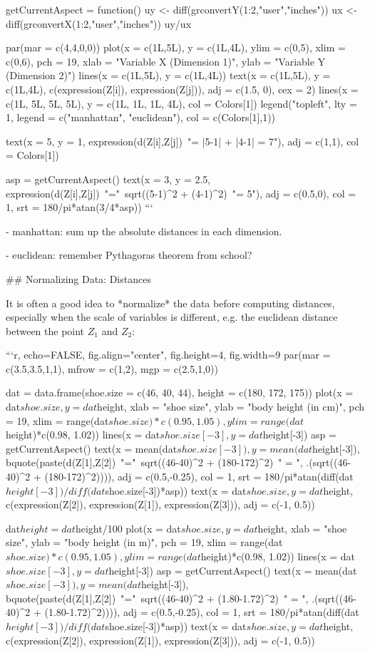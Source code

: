 getCurrentAspect = function() {
   uy <- diff(grconvertY(1:2,"user","inches"))
   ux <- diff(grconvertX(1:2,"user","inches"))
   uy/ux
}

par(mar = c(4,4,0,0))
plot(x = c(1L,5L), y = c(1L,4L), ylim = c(0,5), xlim = c(0,6), pch = 19,
  xlab = "Variable X (Dimension 1)", ylab = "Variable Y (Dimension 2)")
lines(x = c(1L,5L), y = c(1L,4L))
text(x = c(1L,5L), y = c(1L,4L), c(expression(Z[i]), expression(Z[j])), adj = c(1.5, 0), cex = 2)
lines(x = c(1L, 5L, 5L, 5L), y = c(1L, 1L, 1L, 4L), col = Colors[1])
legend("topleft", lty = 1, legend = c("manhattan", "euclidean"), col = c(Colors[1],1))

text(x = 5, y = 1, expression(d(Z[i],Z[j])~"= |5-1| + |4-1| = 7"), adj = c(1,1), col = Colors[1])

asp = getCurrentAspect()
text(x = 3, y = 2.5, expression(d(Z[i],Z[j])~"="~sqrt((5-1)^2 + (4-1)^2)~"= 5"),
  adj = c(0.5,0), col = 1, srt = 180/pi*atan(3/4*asp))
```
\vspace{-10pt}

- \small manhattan: sum up the absolute distances in each dimension.

- \small euclidean: remember Pythagoras theorem from school?

## Normalizing Data: Distances

It is often a good idea to *normalize* the data before computing distances, especially when the scale of variables is different, e.g. the euclidean distance between the point $Z_1$ and $Z_2$:

```{r, echo=FALSE, fig.align="center", fig.height=4, fig.width=9}
par(mar = c(3.5,3.5,1,1), mfrow = c(1,2), mgp = c(2.5,1,0))

dat = data.frame(shoe.size = c(46, 40, 44), height = c(180, 172, 175))
plot(x = dat$shoe.size, y = dat$height, xlab = "shoe size", ylab = "body height (in cm)",
  pch = 19, xlim = range(dat$shoe.size)*c(0.95, 1.05), ylim = range(dat$height)*c(0.98, 1.02))
lines(x = dat$shoe.size[-3], y = dat$height[-3])
asp = getCurrentAspect()
text(x = mean(dat$shoe.size[-3]), y = mean(dat$height[-3]),
  bquote(paste(d(Z[1],Z[2])~"="~sqrt((46-40)^2 + (180-172)^2)~" = ", .(sqrt((46-40)^2 + (180-172)^2)))),
  adj = c(0.5,-0.25), col = 1, srt = 180/pi*atan(diff(dat$height[-3])/diff(dat$shoe.size[-3])*asp))
text(x = dat$shoe.size, y = dat$height, c(expression(Z[2]), expression(Z[1]), expression(Z[3])), adj = c(-1, 0.5))

dat$height = dat$height/100
plot(x = dat$shoe.size, y = dat$height, xlab = "shoe size", ylab = "body height (in m)",
  pch = 19, xlim = range(dat$shoe.size)*c(0.95, 1.05), ylim = range(dat$height)*c(0.98, 1.02))
lines(x = dat$shoe.size[-3], y = dat$height[-3])
asp = getCurrentAspect()
text(x = mean(dat$shoe.size[-3]), y = mean(dat$height[-3]),
  bquote(paste(d(Z[1],Z[2])~"="~sqrt((46-40)^2 + (1.80-1.72)^2)~" = ", .(sqrt((46-40)^2 + (1.80-1.72)^2)))),
  adj = c(0.5,-0.25), col = 1, srt = 180/pi*atan(diff(dat$height[-3])/diff(dat$shoe.size[-3])*asp))
text(x = dat$shoe.size, y = dat$height, c(expression(Z[2]), expression(Z[1]), expression(Z[3])), adj = c(-1, 0.5))

